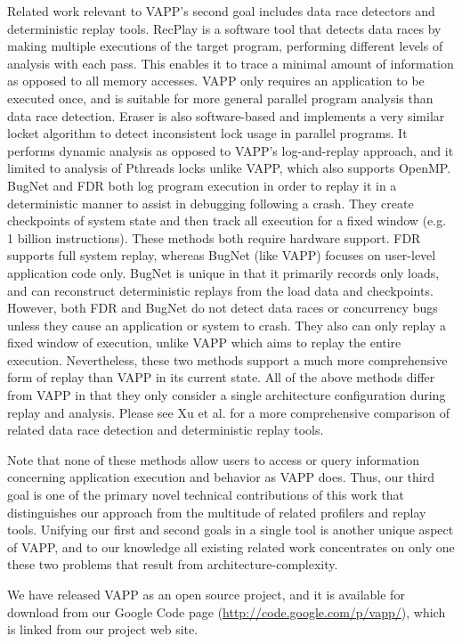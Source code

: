 Related work relevant to VAPP's second goal includes
data race detectors and deterministic replay tools. 
RecPlay \cite{ronsse2000non} is a software tool
that detects data races by making multiple executions of
the target program, performing different levels of
analysis with each pass.  This enables it to trace
a minimal amount of information as opposed to all memory
accesses.  VAPP only requires an application to be
executed once, and is suitable for more general
parallel program analysis than data race detection.
Eraser \cite{savage1997eraser} is also software-based
and implements a very similar locket algorithm to
detect inconsistent lock usage in parallel programs.
It performs dynamic analysis as opposed to VAPP's
log-and-replay approach, and it limited to analysis
of Pthreads locks unlike VAPP, which also supports
OpenMP.  BugNet \cite{narayansamy2005bugnet} and FDR
\cite{xu2003fdr} both log program execution in order
to replay it in a deterministic manner to assist
in debugging following a crash.  They create checkpoints
of system state and then track all execution for a fixed
window (e.g. 1 billion instructions).  These methods
both require hardware support.  FDR supports full system
replay, whereas BugNet (like VAPP) focuses on user-level
application code only.  BugNet is unique in that it
primarily records only loads, and can reconstruct
deterministic replays from the load data and checkpoints.
However, both FDR and BugNet do not detect data races
or concurrency bugs unless they cause an application
or system to crash.  They also can only replay a fixed
window of execution, unlike VAPP which aims to
replay the entire execution.  Nevertheless, these
two methods support a much more comprehensive form of replay
than VAPP in its current state.
All of the above methods differ from VAPP in that they
only consider a single architecture configuration during
replay and analysis.  Please see Xu et al. \cite{xu2003fdr} for a more
comprehensive comparison of related data race detection
and deterministic replay tools.

Note that none of these methods allow users to access or
query information concerning application execution and behavior
as VAPP does.  Thus, our third goal is one of the primary novel
technical contributions of this
work that distinguishes our approach from the multitude of
related profilers and replay tools.  Unifying our first and
second goals in a single tool is another unique aspect of VAPP,
and to our knowledge all existing related work concentrates on 
only one these two problems that result from architecture-complexity.

We have released VAPP as an open source project, and it is available
for download from our Google Code page (\url{http://code.google.com/p/vapp/}),
which is linked from our project web site.